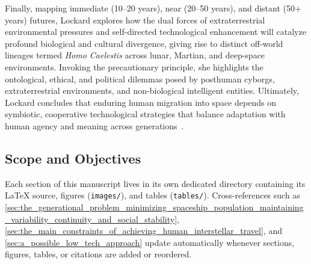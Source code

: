 Finally, mapping immediate (10--20 years), near (20--50 years), and distant (50+ years) futures, Lockard explores how the dual forces of extraterrestrial environmental pressures and self-directed technological enhancement will catalyze profound biological and cultural divergence, giving rise to distinct off-world lineages termed \textit{Homo Caelestis} across lunar, Martian, and deep-space environments. Invoking the precautionary principle, she highlights the ontological, ethical, and political dilemmas posed by posthuman cyborgs, extraterrestrial environments, and non-biological intelligent entities. Ultimately, Lockard concludes that enduring human migration into space depends on symbiotic, cooperative technological strategies that balance adaptation with human agency and meaning across generations~\cite{lockard2014human}.

\subsection{Scope and Objectives}
\label{subsec:scope}

Each section of this manuscript lives in its own dedicated directory containing
its LaTeX source, figures (\texttt{images/}), and tables (\texttt{tables/}).
Cross-references such as \cref{sec:the_generational_problem_minimizing_spaceship_population_maintaining_variability_continuity_and_social_stability},
\cref{sec:the_main_constraints_of_achieving_human_interstellar_travel}, and
\cref{sec:a_possible_low_tech_approach} update automatically whenever sections,
figures, tables, or citations are added or reordered.
